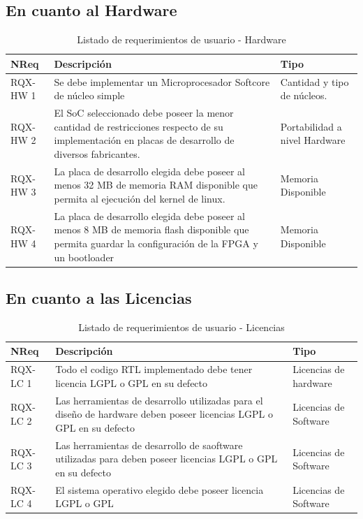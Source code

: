 		\subsection{En cuanto al Hardware}
		\begin{table}[h]
		\centering
		\begin{tabular}{ p{2.5cm} p{8cm} p{3cm} }
		\hline 
		\rowcolor[gray]{0.8} N\textordmasculine Req & Descripción & Tipo\\
		\hline
		RQX-HW 1 &  Se debe implementar un Microprocesador Softcore de núcleo simple & Cantidad y tipo de núcleos. \\
		\hline
		RQX-HW 2 &  El SoC seleccionado debe poseer la menor cantidad de restricciones respecto de su implementación en placas de desarrollo de diversos
		fabricantes. & Portabilidad a nivel Hardware\\
		\hline
		RQX-HW 3 & La placa de desarrollo elegida debe poseer al menos 32 MB de memoria RAM disponible que permita al ejecución del kernel de linux. &
		Memoria Disponible\\
		\hline
		RQX-HW 4 & La placa de desarrollo elegida debe poseer al menos 8 MB de memoria flash disponible que permita guardar la configuración de la FPGA y un
		bootloader & Memoria Disponible\\
		\hline
		\end{tabular}
		\caption{Listado de requerimientos de usuario - Hardware}
		\label{tab:requsr1}
		\end{table}
					
		\subsection{En cuanto a las Licencias}
		\begin{table}[h]
		\centering
		\begin{tabular}{ p{2.5cm} p{8cm} p{3cm} }
		\hline 
		\rowcolor[gray]{0.8} N\textordmasculine Req & Descripción  & Tipo\\
		\hline 
		RQX-LC 1 &  Todo el codigo RTL implementado debe tener licencia LGPL o GPL en su defecto & Licencias de hardware\\
		\hline 
		RQX-LC 2 &  Las herramientas de desarrollo utilizadas para el diseño de hardware  deben poseer licencias LGPL o GPL en su defecto & Licencias de Software\\
		\hline 
		RQX-LC 3 &  Las herramientas de desarrollo de saoftware utilizadas para deben poseer licencias LGPL o GPL en su defecto & Licencias de Software\\
		\hline
		RQX-LC 4 & El sistema operativo elegido debe poseer licencia LGPL o GPL & Licencias de Software\\
		\hline
		\end{tabular}
		\caption{Listado de requerimientos de usuario - Licencias}
		\label{tab:requsr2}
		\end{table}
		
